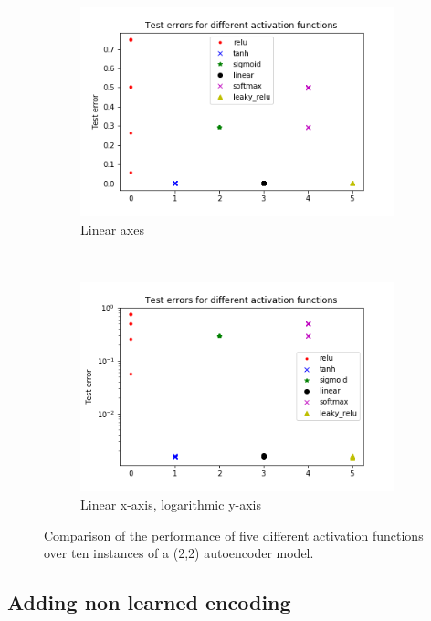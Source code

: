 \documentclass[12pt,onecolumn,letterpaper]{article}
\begin{document}
\begin{figure}[t]
   \centering
   \begin{subfigure}[t]{0.4\textwidth}
       \centering
       \includegraphics[width=\linewidth]{figures/first_act_f_comparisson.png}
       \caption{Linear axes}
   \end{subfigure}
   ~
   \begin{subfigure}[t]{0.4\textwidth}
       \centering
       \includegraphics[width=\linewidth]{figures/first_act_f_comparisson_logy.png}
       \caption{Linear x-axis, logarithmic y-axis}
   \end{subfigure}
   \caption{Comparison of the performance of five different activation functions over ten instances of a (2,2) autoencoder model.}
   \label{fig:ActivationFuncComparison}
\end{figure}


\subsection{Adding non learned encoding}
\end{document}
